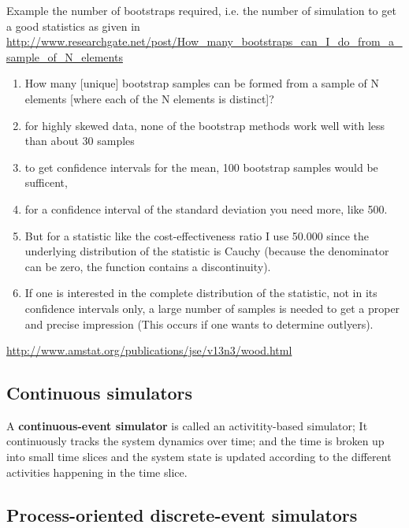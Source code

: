 Example the number of bootstraps required, i.e. the number of simulation to get
a good statistics as given in
\url{http://www.researchgate.net/post/How_many_bootstraps_can_I_do_from_a_sample_of_N_elements}
\begin{enumerate}
  
  \item How many [unique] bootstrap samples can be formed from a sample of N
  elements [where each of the N elements is distinct]?
  
  
  \item for highly skewed data, none of the bootstrap methods work well with
  less than about 30 samples
  
  \item to get confidence intervals for the mean, 100 bootstrap samples would be
  sufficent, 
  
  \item for a confidence interval of the standard deviation you need more,
  like 500. 
  
  \item But for a statistic like the cost-effectiveness ratio I use 50.000 since
  the underlying distribution of the statistic is Cauchy (because the
  denominator can be zero, the function contains a discontinuity).
  
  \item If one is interested in the complete distribution of the statistic, not
  in its confidence intervals only, a large number of samples is needed to get a
  proper and precise impression (This occurs if one wants to determine
  outlyers).
  
\end{enumerate}
\url{http://www.amstat.org/publications/jse/v13n3/wood.html}

\subsection{Continuous simulators}
\label{sec:continuous-simulator}

A {\bf continuous-event simulator} is called an activitity-based simulator;
It continuously tracks the system dynamics over time; and the time is broken 
up into small time slices and the system state is updated according to the 
different activities happening in the time slice.

\subsection{Process-oriented discrete-event simulators}

